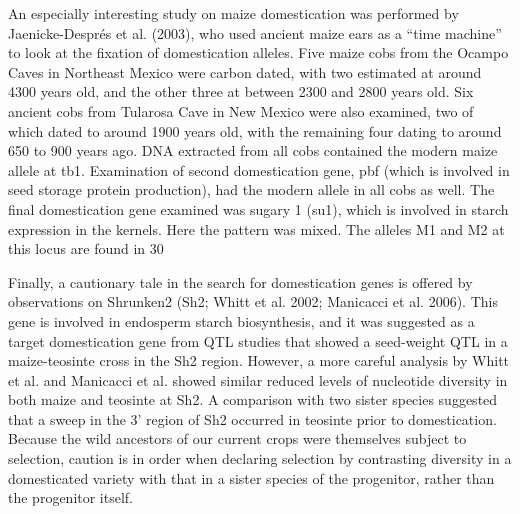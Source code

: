 \documentclass{article}
\begin{document}
An especially interesting study on maize domestication was performed by Jaenicke-Després et al. (2003), who used ancient maize ears as a “time machine” to look at the fixation of domestication alleles. Five maize cobs from the Ocampo Caves in Northeast Mexico were carbon dated, with two estimated at around 4300 years old, and the other three at between 2300 and 2800 years old. Six ancient cobs from Tularosa Cave in New Mexico were also examined, two of which dated to around 1900 years old, with the remaining four dating to around 650 to 900 years ago. DNA extracted from all cobs contained the modern maize allele at tb1. Examination of second domestication gene, pbf (which is involved in seed storage protein production), had the modern allele in all cobs as well. The final domestication gene examined was sugary 1 (su1), which is involved in starch expression in the kernels. Here the pattern was mixed. The alleles M1 and M2 at this locus are found in 30%

Finally, a cautionary tale in the search for domestication genes is offered by observations on Shrunken2 (Sh2; Whitt et al. 2002; Manicacci et al. 2006). This gene is involved in endosperm starch biosynthesis, and it was suggested as a target domestication gene from QTL studies that showed a seed-weight QTL in a maize-teosinte cross in the Sh2 region. However, a more careful analysis by Whitt et al. and Manicacci et al. showed similar reduced levels of nucleotide diversity in both maize and teosinte at Sh2. A comparison with two sister species suggested that a sweep in the 3' region of Sh2 occurred in teosinte prior to domestication. Because the wild ancestors of our current crops were themselves subject to selection, caution is in order when declaring selection by contrasting diversity in a domesticated variety with that in a sister species of the progenitor, rather than the progenitor itself.
\end{document}
